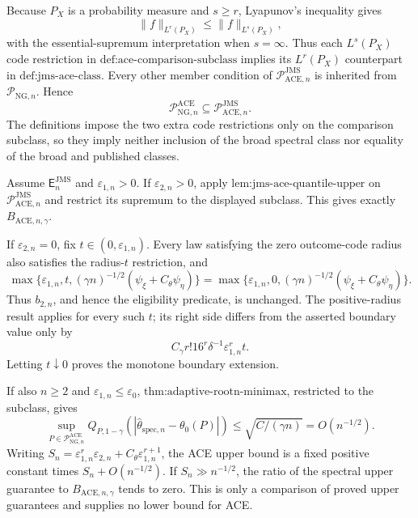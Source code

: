 Because \(P_X\) is a probability measure and \(s\ge r\), Lyapunov's inequality gives
\[
 \|f\|_{L^r(P_X)}\le\|f\|_{L^s(P_X)},
\]
with the essential-supremum interpretation when \(s=\infty\).  Thus each \(L^s(P_X)\) code restriction in \(\text{def:ace-comparison-subclass}\) implies its \(L^r(P_X)\) counterpart in \(\text{def:jms-ace-class}\).  Every other member condition of \(\mathcal P_{\mathrm{ACE},n}^{\mathrm{JMS}}\) is inherited from \(\mathcal P_{\mathrm{NG},n}\).  Hence
\[
 \mathcal P_{\mathrm{NG},n}^{\mathrm{ACE}}
 \subseteq\mathcal P_{\mathrm{ACE},n}^{\mathrm{JMS}}.
\]
The definitions impose the two extra code restrictions only on the comparison subclass, so they imply neither inclusion of the broad spectral class nor equality of the broad and published classes.

Assume \(\mathsf E_n^{\mathrm{JMS}}\) and \(\varepsilon_{1,n}>0\).  If \(\varepsilon_{2,n}>0\), apply \(\text{lem:jms-ace-quantile-upper}\) on \(\mathcal P_{\mathrm{ACE},n}^{\mathrm{JMS}}\) and restrict its supremum to the displayed subclass.  This gives exactly \(B_{\mathrm{ACE},n,\gamma}\).

If \(\varepsilon_{2,n}=0\), fix \(t\in(0,\varepsilon_{1,n})\).  Every law satisfying the zero outcome-code radius also satisfies the radius-\(t\) restriction, and
\[
 \max\{\varepsilon_{1,n},t,
 (\gamma n)^{-1/2}(\psi_{\xi}+C_{\theta}\psi_{\eta})\}
 =
 \max\{\varepsilon_{1,n},0,
 (\gamma n)^{-1/2}(\psi_{\xi}+C_{\theta}\psi_{\eta})\}.
\]
Thus \(b_{2,n}\), and hence the eligibility predicate, is unchanged.  The positive-radius result applies for every such \(t\); its right side differs from the asserted boundary value only by
\[
 C_{\gamma}r!16^r\delta^{-1}\varepsilon_{1,n}^rt.
\]
Letting \(t\downarrow0\) proves the monotone boundary extension.

If also \(n\ge2\) and \(\varepsilon_{1,n}\le\varepsilon_0\), \(\text{thm:adaptive-rootn-minimax}\), restricted to the subclass, gives
\[
 \sup_{P\in\mathcal P_{\mathrm{NG},n}^{\mathrm{ACE}}}
 Q_{P,1-\gamma}(|\widehat\theta_{\mathrm{spec},n}-\theta_0(P)|)
 \le \sqrt{C/(\gamma n)}=O(n^{-1/2}).
\]
Writing \(S_n=\varepsilon_{1,n}^r\varepsilon_{2,n}+C_{\theta}\varepsilon_{1,n}^{r+1}\), the ACE upper bound is a fixed positive constant times \(S_n+O(n^{-1/2})\).  If \(S_n\gg n^{-1/2}\), the ratio of the spectral upper guarantee to \(B_{\mathrm{ACE},n,\gamma}\) tends to zero.  This is only a comparison of proved upper guarantees and supplies no lower bound for ACE.
